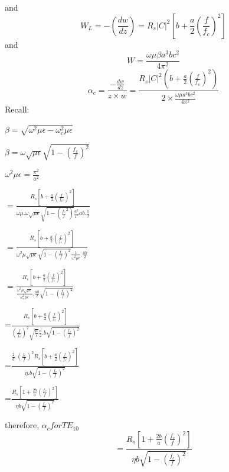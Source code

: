 and 
\begin{equation}
W_L=-(\frac{dw}{dz})= R_s|C|^2[b+\frac{a}{2}(\frac{f}{f_c})^2]	
\end{equation}
and
\begin{equation}
W=\frac{\omega\mu\beta a^3bc^2}{4\pi^2}
\end{equation}
\begin{equation}
\alpha_{c}=\frac{-\frac{dw}{dz}}{z\times w}=\frac{R_s|C|^2(b+\frac{a}{2}(\frac{f}{f_c})^2)}{2\times\frac{\omega\mu a^3bc^2}{4\pi^2}}
\end{equation}
Recall:
\begin{center}
$\beta=\sqrt{\omega^2\mu\epsilon-\omega_c^2\mu\epsilon}$	
\end{center}
\begin{center}
$\beta=\omega\sqrt{\mu\epsilon}\sqrt{1-(\frac{f_c}{f})^2}$	
\end{center}
\begin{center}
$\omega^2\mu\epsilon=\frac{\pi^2}{a^2}$	
\end{center}
\begin{center}
$=\frac{R_s[b+\frac{a}{2}(\frac{f}{f_C})^2]}{\omega\mu.\omega\sqrt{\mu\epsilon}\sqrt{1-(\frac{f_c}{f}^2)}\frac{a^2}{\pi^2}ab.\frac{1}{2}}$	
\end{center}
\begin{center}
$=\frac{R_s[b+\frac{a}{2}(\frac{f}{f_c})^2]}{\omega^2\mu\sqrt{\mu\epsilon}\sqrt{1-(\frac{f_c}{f})^2}\frac{1}{\omega^2\mu\epsilon}.\frac{ab}{2}}$	
\end{center}
\begin{center}
$=\frac{R_s[b+\frac{a}{2}(\frac{f}{f_c})^2]}{\frac{\omega^2\mu\sqrt{\mu\epsilon}}{\omega_c^2\mu\epsilon}.\frac{ab}{2}\sqrt{1-(\frac{f_c}{f})^2}}$	
\end{center}
\begin{center}
=$\frac{R_s[b+\frac{a}{2}(\frac{f}{f_c})^2]}{(\frac{f}{f_c})^2\sqrt{\frac{\mu}{\epsilon}}\frac{a}{2}.b\sqrt{1-(\frac{f_c}{f})^2}}$	
\end{center}
\begin{center}
=$\frac{\frac{2}{a}.(\frac{f_c}{f})^2R_s[b+\frac{a}{2}(\frac{f}{f_c})^2]}{\eta.b\sqrt{1-(\frac{f_c}{f})^2}}$	
\end{center}
\begin{center}
=$\frac{R_s[1+\frac{2b}{a}(\frac{f_c}{f})^2]}{\eta b\sqrt{1-(\frac{f_c}{f})^2}}$	
\end{center}
therefore,
$\alpha_{c} for TE_{10}$
\begin{equation}
=\frac{R_s[1+\frac{2b}{a}(\frac{f_c}{f})^2]}{\eta b\sqrt{1-(\frac{f_c}{f})^2}}	
\end{equation}
